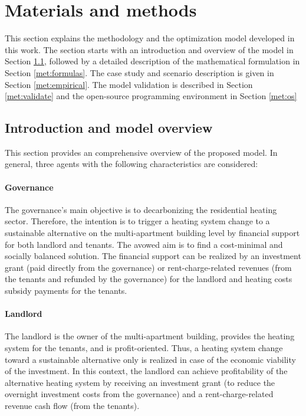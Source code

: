 \newpage
\section{Materials and methods}\label{methodology}
This section explains the methodology and the optimization model developed in this work. The section starts with an introduction and overview of the model in Section \ref{met:intro}, followed by a detailed description of the mathematical formulation in Section \ref{met:formulas}. The case study and scenario description is given in Section \ref{met:empirical}. The model validation is described in Section \ref{met:validate} and the open-source programming environment in Section \ref{met:os}

\subsection{Introduction and model overview}\label{met:intro}
This section provides an comprehensive overview of the proposed model. In general, three agents with the following characteristics are considered:
\paragraph{Governance} The governance's main objective is to decarbonizing the residential heating sector. Therefore, the intention is to trigger a heating system change to a sustainable alternative on the multi-apartment building level by financial support for both landlord and tenants. The avowed aim is to find a cost-minimal and socially balanced solution. The financial support can be realized by an investment grant (paid directly from the governance) or rent-charge-related revenues (from the tenants and refunded by the governance) for the landlord and heating costs subsidy payments for the tenants. 
\paragraph{Landlord} The landlord is the owner of the multi-apartment building, provides the heating system for the tenants, and is profit-oriented. Thus, a heating system change toward a sustainable alternative only is realized in case of the economic viability of the investment. In this context, the landlord can achieve profitability of the alternative heating system by receiving an investment grant (to reduce the overnight investment costs from the governance) and a rent-charge-related revenue cash flow (from the tenants). 
